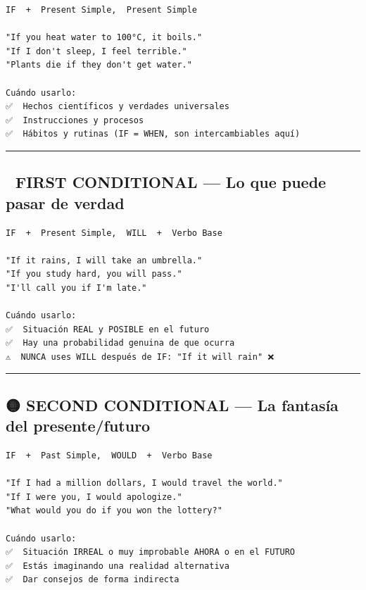 \documentclass[
  spanish,
  letterpaper,
]{scrbook}
\begin{document}
\begin{verbatim}
IF  +  Present Simple,  Present Simple

"If you heat water to 100°C, it boils."
"If I don't sleep, I feel terrible."
"Plants die if they don't get water."

Cuándo usarlo:
✅  Hechos científicos y verdades universales
✅  Instrucciones y procesos
✅  Hábitos y rutinas (IF = WHEN, son intercambiables aquí)
\end{verbatim}

\begin{center}\rule{0.5\linewidth}{0.5pt}\end{center}

\subsection{🔵 FIRST CONDITIONAL --- Lo que puede pasar de
verdad}\label{first-conditional-lo-que-puede-pasar-de-verdad}

\begin{verbatim}
IF  +  Present Simple,  WILL  +  Verbo Base

"If it rains, I will take an umbrella."
"If you study hard, you will pass."
"I'll call you if I'm late."

Cuándo usarlo:
✅  Situación REAL y POSIBLE en el futuro
✅  Hay una probabilidad genuina de que ocurra
⚠️  NUNCA uses WILL después de IF: "If it will rain" ❌
\end{verbatim}

\begin{center}\rule{0.5\linewidth}{0.5pt}\end{center}

\subsection{🟡 SECOND CONDITIONAL --- La fantasía del
presente/futuro}\label{second-conditional-la-fantasuxeda-del-presentefuturo}

\begin{verbatim}
IF  +  Past Simple,  WOULD  +  Verbo Base

"If I had a million dollars, I would travel the world."
"If I were you, I would apologize."
"What would you do if you won the lottery?"

Cuándo usarlo:
✅  Situación IRREAL o muy improbable AHORA o en el FUTURO
✅  Estás imaginando una realidad alternativa
✅  Dar consejos de forma indirecta
\end{verbatim}
\end{document}
